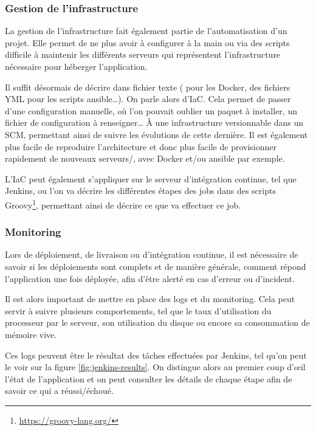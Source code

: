 \subsubsection{Gestion de l'infrastructure}

La gestion de l'infrastructure fait également partie de l'automatisation d'un projet. Elle permet de ne plus avoir à configurer à la main ou via des scripts difficile à maintenir les différents serveurs qui représentent l'infrastructure nécessaire pour héberger l'application.

Il suffit désormais de décrire dans fichier texte ( pour les  Docker, des fichiers YML pour les scripts ansible\ldots). On parle alors d'\gls{IaC}. Cela permet de passer d'une configuration manuelle, où l'on pouvait oublier un paquet à installer, un fichier de configuration à renseigner\ldots{} À une infrastructure versionnable dans un \gls{SCM}, permettant ainsi de suivre les évolutions de cette dernière. Il est également plus facile de reproduire l'architecture et donc plus facile de provisionner rapidement de nouveaux serveurs/, avec Docker et/ou ansible par exemple.

L'\gls{IaC} peut également s'appliquer sur le serveur d'intégration continue, tel que Jenkins, ou l'on va décrire les différentes étapes des jobs dans des scripts Groovy\footnote{\url{https://groovy-lang.org/}}, permettant ainsi de décrire ce que va effectuer ce job.

\subsubsection{Monitoring}\label{paragraph:monitoring}

Lors de déploiement, de livraison ou d'intégration continue, il est nécessaire de savoir si les déploiements sont complets et de manière générale, comment répond l'application une fois déployée, afin d'être alerté en cas d'erreur ou d'incident.

Il est alors important de mettre en place des logs et du monitoring. Cela peut servir à suivre plusieurs comportements, tel que le taux d'utilisation du processeur par le serveur, son utilisation du disque ou encore sa consommation de mémoire vive.

Ces logs peuvent être le résultat des tâches effectuées par Jenkins, tel qu'on peut le voir sur la figure \ref{fig:jenkins-results}. On distingue alors au premier coup d'œil l'état de l'application et on peut consulter les détails de chaque étape afin de savoir ce qui a réussi/échoué.

